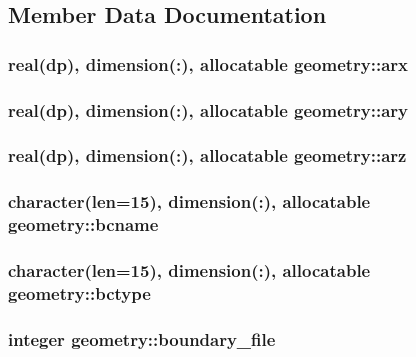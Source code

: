 \subsection{Member Data Documentation}
\hypertarget{classgeometry_a471fde959c1d2bdc45facc53fae5fb5b}{
\subsubsection[{arx}]{\setlength{\rightskip}{0pt plus 5cm}real(dp), dimension(\-:), allocatable geometry\-::arx}}\label{classgeometry_a471fde959c1d2bdc45facc53fae5fb5b}
\hypertarget{classgeometry_a20e05e2b4e25753dc0892a77029b94b8}{
\subsubsection[{ary}]{\setlength{\rightskip}{0pt plus 5cm}real(dp), dimension(\-:), allocatable geometry\-::ary}}\label{classgeometry_a20e05e2b4e25753dc0892a77029b94b8}
\hypertarget{classgeometry_af05cbfe19f538092a328e02ba17ec1b9}{
\subsubsection[{arz}]{\setlength{\rightskip}{0pt plus 5cm}real(dp), dimension(\-:), allocatable geometry\-::arz}}\label{classgeometry_af05cbfe19f538092a328e02ba17ec1b9}
\hypertarget{classgeometry_a4e43a18bec8fa1fa370aebdf28b26723}{
\subsubsection[{bcname}]{\setlength{\rightskip}{0pt plus 5cm}character(len=15), dimension(\-:), allocatable geometry\-::bcname}}\label{classgeometry_a4e43a18bec8fa1fa370aebdf28b26723}
\hypertarget{classgeometry_a273882b8b9ef9670ecef4c22d7a1ffc3}{
\subsubsection[{bctype}]{\setlength{\rightskip}{0pt plus 5cm}character(len=15), dimension(\-:), allocatable geometry\-::bctype}}\label{classgeometry_a273882b8b9ef9670ecef4c22d7a1ffc3}
\hypertarget{classgeometry_a7b1e102e0a1a96f15dcd1def8d7e0e28}{
\subsubsection[{boundary\-\_\-file}]{\setlength{\rightskip}{0pt plus 5cm}integer geometry\-::boundary\-\_\-file}}\label{classgeometry_a7b1e102e0a1a96f15dcd1def8d7e0e28}
